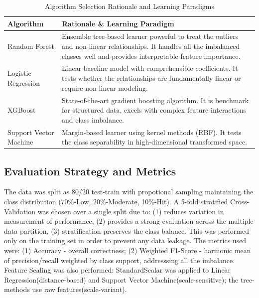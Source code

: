 \documentclass{article}
\begin{document}
\begin{table}[h!]
\begin{tabular}{|p{3cm}|p{10cm}|}
\hline
\textbf{Algorithm} & \textbf{Rationale \& Learning Paradigm} \\
\hline
Random Forest \cite{RandomForest} & Ensemble tree-based learner \cite{ensemble_techniques} powerful to treat the outliers and non-linear relationships. It handles all the  imbalanced classes well and provides interpretable feature importance. \\
\hline
Logistic Regression \cite{LogisticRegression} & Linear baseline model with comprehensible coefficients. It tests whether the relationships are fundamentally linear or require non-linear modeling. \\
\hline
XGBoost \cite{GradBoost} & State-of-the-art gradient boosting algorithm. It is benchmark for structured data, excels with complex feature interactions and class imbalance. \\
\hline
Support Vector Machine \cite{SupportVecMach} & Margin-based learner using kernel methods (RBF). It tests the class separability in high-dimensional transformed space. \\
\hline
\end{tabular}
\vspace{0.2 cm}
\centering
\caption{Algorithm Selection Rationale and Learning Paradigms}
\label{tab:algorithms}
\end{table}

\subsection{Evaluation Strategy and Metrics}
The data was split as 80/20 test-train with propotional sampling maintaining the class distribution (70\%-Low, 20\%-Moderate, 10\%-Hit). A 5-fold stratified Cross-Validation was chosen over a single split due to: (1) reduces variation in measurement of performance, (2) provides a strong evaluation across the multiple data partition, (3) stratification preserves the class balance. This was performed only on the training set in order to prevent any data leakage. The metrics used were: (1) Accuracy - overall correctness; (2) Weighted F1-Score - harmonic mean of precision/recall weighted by class support, addresssing all the imbalance. Feature Scaling was also performed: StandardScalar was applied to Linear Regression(distance-based) and Support Vector Machine(scale-sensitive); the tree-methods use raw features(scale-variant). 
\end{document}
